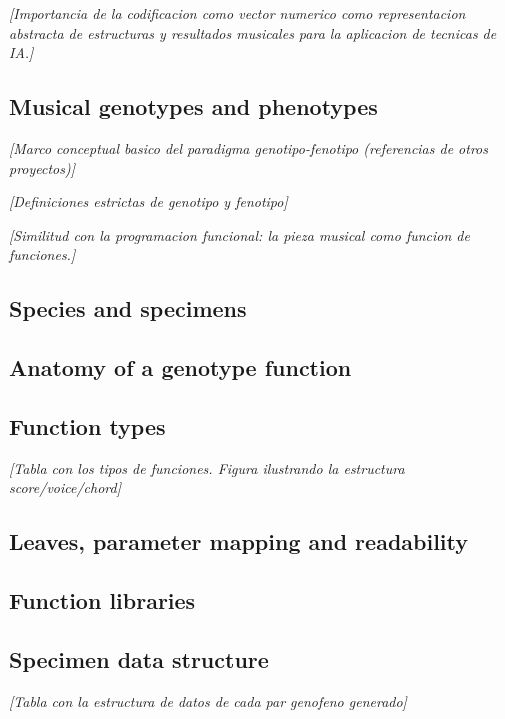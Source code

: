 \documentclass{article}
\begin{document}
{\color{gray} \textsl{[Importancia de la codificacion como vector numerico como representacion abstracta de estructuras y resultados musicales para la aplicacion de tecnicas de IA.]}}


\subsection{Musical genotypes and phenotypes}

{\color{gray} \textsl{[Marco conceptual basico del paradigma genotipo-fenotipo (referencias de otros proyectos)]}}

{\color{gray} \textsl{[Definiciones estrictas de genotipo y fenotipo]}}


{\color{gray} \textsl{[Similitud con la programacion funcional: la pieza musical como funcion de funciones.]}}

\subsection{Species and specimens}

\subsection{Anatomy of a genotype function}

\subsection{Function types}

{\color{gray} \textsl{[Tabla con los tipos de funciones. Figura ilustrando la estructura score/voice/chord]}}

\subsection{Leaves, parameter mapping and readability}

\subsection{Function libraries}

\subsection{Specimen data structure}


{\color{gray} \textsl{[Tabla con la estructura de datos de cada par geno\/feno generado]}}
\end{document}
